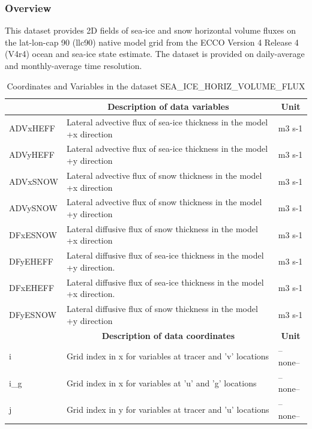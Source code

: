 \subsubsection{Overview}
This dataset provides 2D fields of sea-ice and snow horizontal volume fluxes on the lat-lon-cap 90 (llc90) native model grid from the ECCO Version 4 Release 4 (V4r4) ocean and sea-ice state estimate. The dataset is provided on daily-average and monthly-average time resolution. 
\begin{longtable}{|m{}|m{}|m{}|}
\caption{Coordinates and Variables in the dataset SEA\_ICE\_HORIZ\_VOLUME\_FLUX}
\label{tab:table-SEA_ICE_HORIZ_VOLUME_FLUX-fields} \\ 
\hline \endhead \hline \endfoot
\rowcolor{lightgray} \multicolumn{1}{|c|}{\textbf{Variables}} & \multicolumn{1}{|c|}{\textbf{Description of data variables}} &  \multicolumn{1}{|c|}{\textbf{Unit}}\\ \hline
ADVxHEFF &Lateral advective flux of sea-ice thickness in the model +x direction &m3 s-1  \\ \hline
ADVyHEFF &Lateral advective flux of sea-ice thickness in the model +y direction &m3 s-1  \\ \hline
ADVxSNOW &Lateral advective flux of snow thickness in the model +x direction &m3 s-1  \\ \hline
ADVySNOW &Lateral advective flux of snow thickness in the model +y direction &m3 s-1  \\ \hline
DFxESNOW &Lateral diffusive flux of snow thickness in the model +x direction &m3 s-1  \\ \hline
DFyEHEFF &Lateral diffusive flux of sea-ice thickness in the model +y direction. &m3 s-1  \\ \hline
DFxEHEFF &Lateral diffusive flux of sea-ice thickness in the model +x direction. &m3 s-1  \\ \hline
DFyESNOW &Lateral diffusive flux of snow thickness in the model +y direction &m3 s-1  \\ \hline
\rowcolor{lightgray} \multicolumn{1}{|c|}{\textbf{Coordinates}} & \multicolumn{1}{|c|}{\textbf{Description of data coordinates}} &  \multicolumn{1}{|c|}{\textbf{Unit}}\\ \hline
i &Grid index in x for variables at tracer and 'v' locations &--none--  \\ \hline
i\_g &Grid index in x for variables at 'u' and 'g' locations &--none--  \\ \hline
j &Grid index in y for variables at tracer and 'u' locations &--none--  \\ \hline

\end{longtable}
